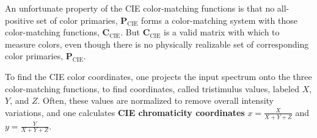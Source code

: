 An unfortunate property of the CIE color-matching functions is that no all-positive set of color primaries, $\mathbf{P}_{\mbox{CIE}}$ forms a color-matching system with those color-matching functions, $\mathbf{C}_{\mbox{CIE}}$.  But $\mathbf{C}_{\mbox{CIE}}$ is a valid matrix with which to measure colors, even though there is no physically realizable set of corresponding color primaries, $\mathbf{P}_{\mbox{CIE}}$.

To find the CIE color coordinates, one projects the input spectrum
onto the three color-matching functions, to find coordinates, called
tristimulus values, labeled $X$, $Y$, and $Z$.   Often, these values are
normalized to remove overall intensity variations, and one calculates {\bf CIE chromaticity coordinates} $x = \frac{X}{X+Y+Z}$ and $y = \frac{Y}{X+Y+Z}$.

